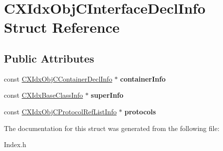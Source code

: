 \hypertarget{structCXIdxObjCInterfaceDeclInfo}{}\section{C\+X\+Idx\+Obj\+C\+Interface\+Decl\+Info Struct Reference}
\label{structCXIdxObjCInterfaceDeclInfo}
\subsection*{Public Attributes}
\begin{DoxyCompactItemize}
\item 
\mbox{\label{structCXIdxObjCInterfaceDeclInfo_a78f2d414d9b454cf8e8c4c98465a3b60}} 
const \mbox{\hyperlink{structCXIdxObjCContainerDeclInfo}{C\+X\+Idx\+Obj\+C\+Container\+Decl\+Info}} $\ast$ {\bfseries container\+Info}
\item 
\mbox{\label{structCXIdxObjCInterfaceDeclInfo_a4e3694b3b541e1439b3943b9018fef2b}} 
const \mbox{\hyperlink{structCXIdxBaseClassInfo}{C\+X\+Idx\+Base\+Class\+Info}} $\ast$ {\bfseries super\+Info}
\item 
\mbox{\label{structCXIdxObjCInterfaceDeclInfo_ae80ff98875781dfda5b52f76f3629fe6}} 
const \mbox{\hyperlink{structCXIdxObjCProtocolRefListInfo}{C\+X\+Idx\+Obj\+C\+Protocol\+Ref\+List\+Info}} $\ast$ {\bfseries protocols}
\end{DoxyCompactItemize}


The documentation for this struct was generated from the following file\+:\begin{DoxyCompactItemize}
\item 
Index.\+h\end{DoxyCompactItemize}
